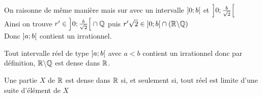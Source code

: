 \begin{dem}
\begin{itemize}
\begin{itemize}
            On raisonne de même manière mais sur avec un intervalle \(\left]0;b\right[\) et \(\left]0;\frac{b}{\sqrt{2}}\right[\)\\
            Ainsi on trouve \(r'\in \left]0;\frac{b}{\sqrt{2}}\right[\cap \mathbb{Q}\) puis \(r'\sqrt{2} \in \left]0;b\right[\cap\left(\mathbb{R}\backslash\mathbb{Q}\right)\)\\
            Donc \(\left]a;b\right[\) contient un irrationnel.
        \end{itemize}
    \end{itemize}
    \conclusion Tout intervalle réel de type \(\left]a;b\right[\) avec \(a<b\) contient un irrationnel donc par définition, \(\mathbb{R}\backslash\mathbb{Q}\) est dense dans \(\mathbb{R}\).
\end{dem}

\begin{theo}
    Une partie \(X\) de \(\mathbb{R}\) est dense dans \(\mathbb{R}\) si, et seulement si, tout réel est limite d'une suite d'élément de \(X\)
\end{theo}
